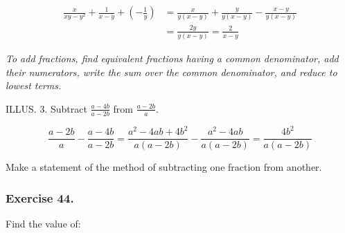 \documentclass{book}
\begin{document}
\begin{align*}
\frac{x}{xy-y^2} + \frac{1}{x-y} + (-\frac{1}{y})
&= \frac{x}{y(x-y)} + \frac{y}{y(x-y)} - \frac{x-y}{y(x-y)}\\
&= \frac{2y}{y(x-y)} = \frac{2}{x-y}
\end{align*}

\textit{To add fractions, find equivalent fractions having a
common denominator, add their numerators, write the sum over the
common denominator, and reduce to lowest terms.}

ILLUS. 3. Subtract $\frac{a-4b}{a-2b}$ from $\frac{a-2b}{a}$.

\[
\frac{a-2b}{a}-\frac{a-4b}{a-2b}=\frac{a^2-4ab+4b^2}{a(a-2b)}-\frac{a^2-4ab}{a(a-2b)}=\frac{4b^2}{a(a-2b)}
\]


Make a statement of the method of subtracting one
fraction from another.\\

\subsubsection*{Exercise 44.}

Find the value of:
\end{document}

